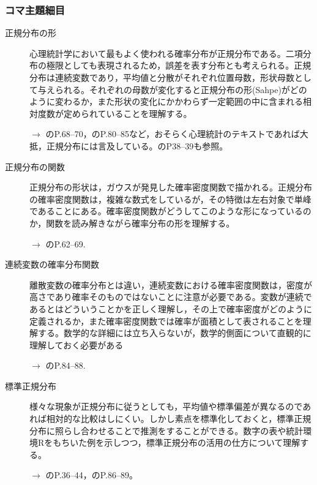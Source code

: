 \subsubsection{コマ主題細目}
\begin{description}
\item[正規分布の形]心理統計学において最もよく使われる確率分布が正規分布である。二項分布の極限としても表現されるため，誤差を表す分布とも考えられる。正規分布は連続変数であり，平均値と分散がそれぞれ位置母数，形状母数として与えられる。それぞれの母数が変化すると正規分布の形(Sahpe)がどのように変わるか，また形状の変化にかかわらず一定範囲の中に含まれる相対度数が定められていることを理解する。
\begin{flushright}
    $\to$ \citet{野島201903}のP.68--70，\citet{Yamada2004}のP.80--85など，おそらく心理統計のテキストであれば大抵，正規分布には言及している。\citet{長沼201611}のP38--39も参照。
\end{flushright}

\item[正規分布の関数]正規分布の形状は，ガウスが発見した確率密度関数で描かれる。正規分布の確率密度関数は，複雑な数式をしているが，その特徴は左右対象で単峰であることにある。確率密度関数がどうしてこのような形になっているのか，関数を読み解きながら確率分布の形を理解する。
\begin{flushright}
    $\to$ \citet{長沼201611}のP.62--69.
\end{flushright}

\item[連続変数の確率分布関数]離散変数の確率分布とは違い，連続変数における確率密度関数は，密度が高さであり確率そのものではないことに注意が必要である。変数が連続であるとはどういうことかを正しく理解し，その上で確率密度がどのように定義されるか，また確率密度関数では確率が面積として表されることを理解する。数学的な詳細には立ち入らないが，数学的側面について直観的に理解しておく必要がある
\begin{flushright}
    $\to$ \citet{Maeda2017}のP.84--88.
\end{flushright}

\item[標準正規分布]様々な現象が正規分布に従うとしても，平均値や標準偏差が異なるのであれば相対的な比較はしにくい。しかし素点を標準化しておくと，標準正規分布に照らし合わせることで推測をすることができる。数字の表や統計環境Rをもちいた例を示しつつ，標準正規分布の活用の仕方について理解する。
\begin{flushright}
    $\to$ \citet{川端201408}のP.36--44，\citet{Yamada2004}のP.86--89。
\end{flushright}

\end{description}
